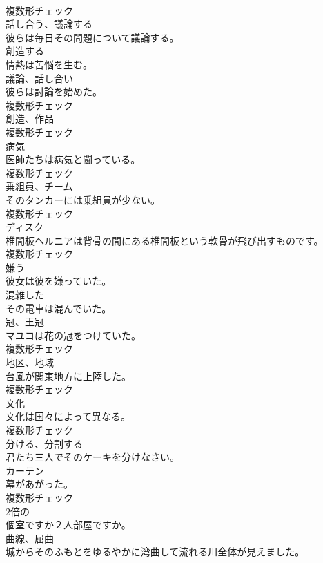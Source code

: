 \documentclass[8pt]{extreport}
\begin{document}
\begin{CJK}{UTF8}{min}
\\	複数形チェック
\\	[動詞]	話し合う、議論する	
\\	彼らは毎日その問題について議論する。	
\\	[動詞]	創造する	
\\	情熱は苦悩を生む。	
\\	[名詞]	議論、話し合い	
\\	彼らは討論を始めた。	
\\	複数形チェック
\\	[名詞]	創造、作品	
\\	複数形チェック
\\	[名詞]	病気	
\\	医師たちは病気と闘っている。	
\\	複数形チェック
\\	[名詞]	乗組員、チーム	
\\	そのタンカーには乗組員が少ない。	
\\	複数形チェック
\\	[名詞]	ディスク	
\\	椎間板ヘルニアは背骨の間にある椎間板という軟骨が飛び出すものです。	
\\	複数形チェック
\\	[動詞]	嫌う	
\\	彼女は彼を嫌っていた。	
\\	[形容詞]	混雑した	
\\	その電車は混んでいた。	
\\	[名詞]	冠、王冠	
\\	マユコは花の冠をつけていた。	
\\	複数形チェック
\\	[名詞]	地区、地域	
\\	台風が関東地方に上陸した。	
\\	複数形チェック
\\	[名詞]	文化	
\\	文化は国々によって異なる。	
\\	複数形チェック
\\	[動詞]	分ける、分割する	
\\	君たち三人でそのケーキを分けなさい。	
\\	[名詞]	カーテン	
\\	幕があがった。	
\\	複数形チェック
\\	[形容詞]	2倍の	
\\	個室ですか２人部屋ですか。	
\\	[名詞]	曲線、屈曲	
\\	城からそのふもとをゆるやかに湾曲して流れる川全体が見えました。	

\end{CJK}
\end{document}
